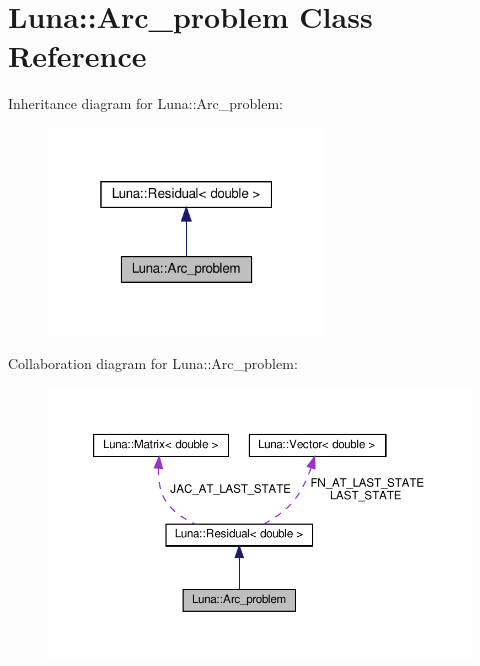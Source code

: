 \hypertarget{classLuna_1_1Arc__problem}{}\section{Luna\+:\+:Arc\+\_\+problem Class Reference}
\label{classLuna_1_1Arc__problem}


Inheritance diagram for Luna\+:\+:Arc\+\_\+problem\+:\nopagebreak
\begin{figure}[H]
\begin{center}
\leavevmode
\includegraphics[width=208pt]{classLuna_1_1Arc__problem__inherit__graph}
\end{center}
\end{figure}


Collaboration diagram for Luna\+:\+:Arc\+\_\+problem\+:\nopagebreak
\begin{figure}[H]
\begin{center}
\leavevmode
\includegraphics[width=350pt]{classLuna_1_1Arc__problem__coll__graph}
\end{center}
\end{figure}
